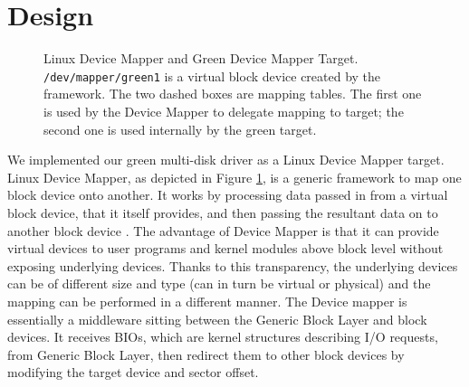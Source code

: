 \section{Design}
\label{sec:design}

\begin{figure}[ht]
\begin{centering}
\caption{Linux Device Mapper and Green Device Mapper Target.
\texttt{/dev/mapper/green1} is a virtual block device created by the
framework. The two dashed boxes are mapping tables. The first one is
used by the Device Mapper to delegate mapping to target; the second
one is used internally by the green target.}
\label{fig:dm}
\end{centering}
\end{figure}

We implemented our green multi-disk driver as a Linux Device Mapper
target. Linux Device Mapper, as depicted in Figure \ref{fig:dm}, is a
generic framework to map one block device onto another. It works by
processing data passed in from a virtual block device, that it itself
provides, and then passing the resultant data on to another block
device \cite{wiki_dm}. The advantage of Device Mapper is that it can
provide virtual devices to user programs and kernel modules above
block level without exposing underlying devices.  Thanks to this
transparency, the underlying devices can be of different size and type
(can in turn be virtual or physical) and the mapping can be performed
in a different manner. The Device mapper is essentially a middleware
sitting between the Generic Block Layer and block devices. It receives
BIOs, which are kernel structures describing I/O requests, from
Generic Block Layer, then redirect them to other block devices by
modifying the target device and sector offset. 

